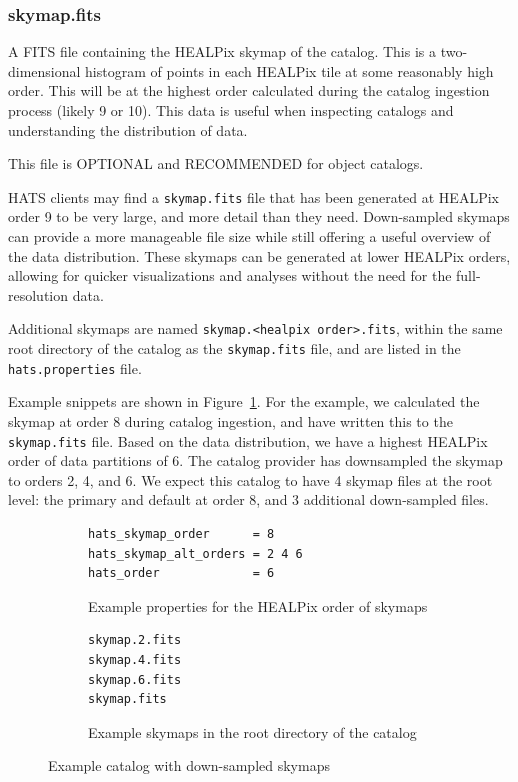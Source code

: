 \documentclass[11pt,a4paper]{ivoa}
\begin{document}
\subsubsection{skymap.fits} 

A FITS file containing the HEALPix skymap of the catalog.
This is a two-dimensional histogram of points in each HEALPix tile at some reasonably high order.
This will be at the highest order calculated during the catalog ingestion process (likely 9 or 10). 
This data is useful when inspecting catalogs and understanding the distribution of data. 

This file is OPTIONAL and RECOMMENDED for object catalogs.

HATS clients may find a \texttt{skymap.fits} file that has been generated at HEALPix order 9 to be very large, and more detail than they need.
Down-sampled skymaps can provide a more manageable file size while still offering a useful overview of the data distribution. 
These skymaps can be generated at lower HEALPix orders, allowing for quicker visualizations and analyses without the need for the full-resolution data.

Additional skymaps are named \texttt{skymap.<healpix order>.fits}, within the same root directory of the catalog as the \texttt{skymap.fits} file, and are listed in the \texttt{hats.properties} file.

Example snippets are shown in Figure~\ref{fig:skymapProperties}.
For the example, we calculated the skymap at order 8 during catalog ingestion, and have written this to the \texttt{skymap.fits} file.
Based on the data distribution, we have a highest HEALPix order of data partitions of 6.
The catalog provider has downsampled the skymap to orders 2, 4, and 6. 
We expect this catalog to have 4 skymap files at the root level: the primary and default at order 8, and 3 additional down-sampled files.

\begin{figure}
\begin{subfigure}[h]{0.5\linewidth}
\begin{lstlisting}
hats_skymap_order      = 8
hats_skymap_alt_orders = 2 4 6
hats_order             = 6
\end{lstlisting}
\caption{Example properties for the HEALPix order of skymaps}
\end{subfigure}
\hfill
\begin{subfigure}[h]{0.4\linewidth}
\begin{lstlisting}
skymap.2.fits
skymap.4.fits
skymap.6.fits
skymap.fits
\end{lstlisting}
\caption{Example skymaps in the root directory of the catalog}
\end{subfigure}
\caption{Example catalog with down-sampled skymaps}
\label{fig:skymapProperties}
\end{figure}
\end{document}
